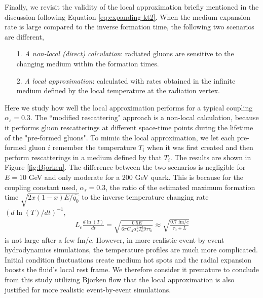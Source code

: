 \documentclass[aps, prc, reprint, amsmath, groupedaddress, nofootinbib]{revtex4-1}
\begin{document}
Finally, we revisit the validity of the local approximation briefly mentioned in the discussion following Equation \ref{eq:expanding-kt2}.
When the medium expansion rate is large compared to the inverse formation time, the following two scenarios are different,
\begin{itemize}
\item[1.]  {\it A non-local (direct) calculation}: radiated gluons are sensitive to the changing medium within the formation times.
\item[2.] {\it A local approximation}: calculated with rates obtained in the infinite medium defined by the local temperature at the radiation vertex.
\end{itemize} 
Here we study how well the local approximation performs for a typical coupling $\alpha_s = 0.3$.
The ``modified rescattering" approach is  a non-local calculation, because it performs gluon rescatterings at different space-time points during the lifetime of the "pre-formed gluons". 
To mimic the local approximation, we let each pre-formed gluon $i$ remember the temperature $T_i$ when it was first created and then perform rescatterings in a medium defined by that $T_i$.
The results are shown in Figure \ref{fig:Bjorken}. 
The difference between the two scenarios is negligible for $E=10$ GeV and  only moderate for a 200 GeV quark.
This is because for the coupling constant used, $\alpha_s = 0.3$, the ratio of the estimated maximum formation time $\sqrt{2x(1-x)E/\hat{q_0}}$ to the inverse temperature changing rate $(d\ln(T)/dt)^{-1}$,
\begin{eqnarray}
L_c \frac{d\ln(T)}{dt} = \sqrt{\frac{0.5 E}{6\pi C_A\alpha_s^2 T_0^3 9\tau\tau_0}} \approx \sqrt{\frac{0.7 \textrm{ fm}/c}{\tau_0+L}}
\end{eqnarray}
is not large after a few fm/$c$. 
However, in more realistic event-by-event hydrodynamics simulations, the temperature profiles are much more complicated.
Initial condition fluctuations create medium hot spots and the radial expansion boosts the fluid's local  rest frame.
We therefore consider it premature to conclude from this study utilizing Bjorken flow that the local approximation is also justified for more realistic event-by-event simulations.
\end{document}
